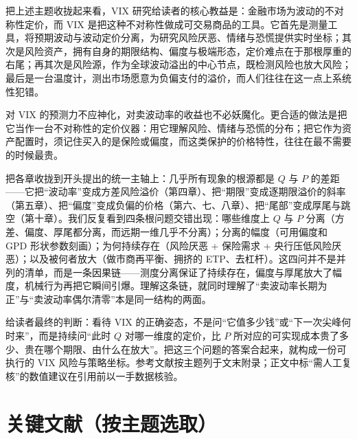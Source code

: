 \documentclass[11pt,a4paper]{ctexart}
\begin{document}
把上述主题收拢起来看，VIX 研究给读者的核心教益是：金融市场为波动的不对称性定价，而 VIX 是把这种不对称性做成可交易商品的工具。它首先是测量工具，将预期波动与波动定价分离，为研究风险厌恶、情绪与恐慌提供实时坐标；其次是风险资产，拥有自身的期限结构、偏度与极端形态，定价难点在于那根厚重的右尾；再其次是风险源，作为全球波动溢出的中心节点，既检测风险也放大风险；最后是一台温度计，测出市场愿意为负偏支付的溢价，而人们往往在这一点上系统性犯错。

对 VIX 的预测力不应神化，对卖波动率的收益也不必妖魔化。更合适的做法是把它当作一台不对称性的定价仪器：用它理解风险、情绪与恐慌的分布；把它作为资产配置时，须记住买入的是保险或偏度，而这类保护的价格特性，往往在最不需要的时候最贵。

把各章收拢到开头提出的统一主轴上：几乎所有现象的根源都是 $Q$ 与 $P$ 的差距——它把“波动率”变成方差风险溢价（第四章）、把“期限”变成逐期限溢价的斜率（第五章）、把“偏度”变成负偏的价格（第六、七、八章）、把“尾部”变成厚尾与跳空（第十章）。我们反复看到四条根问题交错出现：哪些维度上 $Q$ 与 $P$ 分离（方差、偏度、厚尾都分离，而远期一维几乎不分离）；分离的幅度（可用偏度和 GPD 形状参数刻画）；为何持续存在（风险厌恶 + 保险需求 + 央行压低风险厌恶）；以及被何者放大（做市商再平衡、拥挤的 ETP、去杠杆）。这四问并不是并列的清单，而是一条因果链——测度分离保证了持续存在，偏度与厚尾放大了幅度，机械行为再把它瞬间引爆。理解这条链，就同时理解了“卖波动率长期为正”与“卖波动率偶尔清零”本是同一结构的两面。

给读者最终的判断：看待 VIX 的正确姿态，不是问“它值多少钱”或“下一次尖峰何时来”，而是持续问“此时 $Q$ 对哪一维度的定价，比 $P$ 所对应的可实现成本贵了多少、贵在哪个期限、由什么在放大”。把这三个问题的答案合起来，就构成一份可执行的 VIX 风险与策略坐标。参考文献按主题列于文末附录；正文中标“需人工复核”的数值建议在引用前以一手数据核验。

\appendix
\section{关键文献（按主题选取）}
\end{document}
